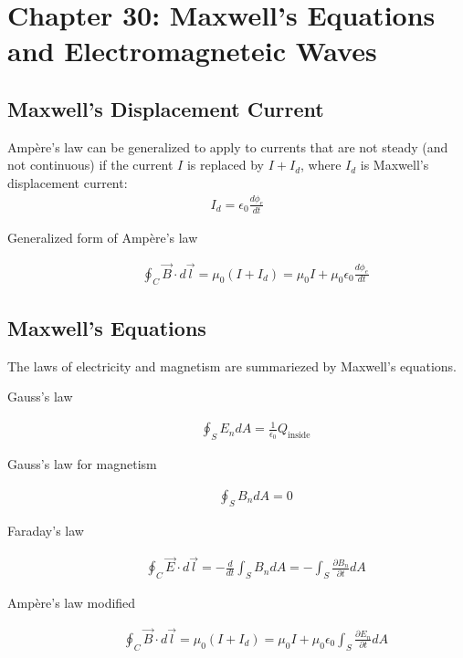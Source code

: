 \documentclass[../main.tex]{subfiles}
\begin{document}
\section{Chapter 30: Maxwell's Equations and Electromagneteic Waves}
\label{sec:chapter_30_maxwell_s_equations_and_electromagneteic_waves}

\subsection{Maxwell's Displacement Current}
\label{sub:maxwell_s_displacement_current}

Amp\`ere's law can be generalized to apply to currents that are not steady (and
not continuous) if the current $I$ is replaced by $I + I_d$, where $I_d$ is
Maxwell's displacement current:
\begin{align}
  I_d = \epsilon_0\frac{d\phi_e}{dt}
\end{align}

\begin{description}
  \item[Generalized form of Amp\`ere's law]
    \begin{align}
      \oint_C\vec{B}\cdot d\vec{l} =
      \mu_0\left(I+I_d\right)=\mu_0I+\mu_0\epsilon_0\frac{d\phi_e}{dt}
    \end{align}
\end{description}

\subsection{Maxwell's Equations}
\label{sub:maxwell_s_equations}

The laws of electricity and magnetism are summariezed by Maxwell's equations.

\begin{description}
  \item[Gauss's law]
    \begin{align}
      \oint_SE_ndA=\frac{1}{\epsilon_0}Q_\text{inside}
    \end{align}
  \item[Gauss's law for magnetism]
    \begin{align}
      \oint_SB_ndA = 0
    \end{align}
  \item[Faraday's law]
    \begin{align}
      \oint_C\vec{E}\cdot d\vec{l} =
      -\frac{d}{dt}\int_SB_ndA=-\int_S\frac{\partial B_n}{\partial t}dA
    \end{align}
  \item[Amp\`ere's law modified]
    \begin{align}
      \oint_C\vec{B}\cdot d\vec{l} =
      \mu_0\left(I+I_d\right)=\mu_0I+\mu_0\epsilon_0\int_S\frac{\partial
      E_n}{\partial t} dA
    \end{align}
\end{description}
\end{document}
